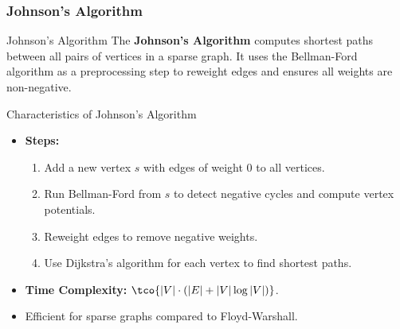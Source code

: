 \newpage
\subsubsection{Johnson's Algorithm}
\begin{definition}[]{Johnson's Algorithm}
    The \textbf{Johnson’s Algorithm} computes shortest paths between all pairs of vertices in a sparse graph. It uses the Bellman-Ford algorithm as a preprocessing step to reweight edges and ensures all weights are non-negative.
\end{definition}

\begin{properties}[]{Characteristics of Johnson's Algorithm}
    \begin{itemize}
        \item \textbf{Steps:}
              \begin{enumerate}
                  \item Add a new vertex $s$ with edges of weight $0$ to all vertices.
                  \item Run Bellman-Ford from $s$ to detect negative cycles and compute vertex potentials.
                  \item Reweight edges to remove negative weights.
                  \item Use Dijkstra's algorithm for each vertex to find shortest paths.
              \end{enumerate}
        \item \textbf{Time Complexity:} $\tco{|V| \cdot (|E| + |V| \log |V|)}$.
        \item Efficient for sparse graphs compared to Floyd-Warshall.
    \end{itemize}
\end{properties}


